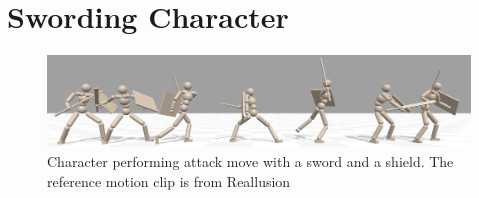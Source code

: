 \section{Swording Character}
\begin{figure}[h]
    \centering
    \includegraphics[width=\textwidth]{figures/qp/sword_shield.png}
    \caption{Character performing attack move with a sword and a shield. The reference motion clip is from Reallusion~\citep{Reallusion}}
    \vspace{-20pt}
    \label{fig:sword}
\end{figure}







